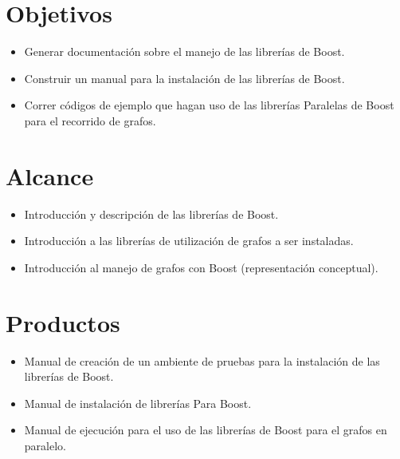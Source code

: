 \section{Objetivos}

	\begin{itemize}
		\item Generar documentación sobre el manejo de las librerías de Boost.
		\item Construir un manual para la instalación de las librerías de Boost.
		\item Correr códigos de ejemplo que hagan uso de las librerías Paralelas de Boost para el recorrido de grafos.	
	\end{itemize}

\section{Alcance}
	\begin{itemize}
		\item Introducción y descripción de las librerías de Boost.
		\item Introducción a las librerías de utilización de grafos a ser instaladas.
		\item Introducción al manejo de grafos con Boost (representación conceptual).
	\end{itemize}

\section{Productos}
	\begin{itemize}
		\item Manual de creación de un ambiente de pruebas para la instalación de las librerías de Boost.
		\item Manual de instalación de librerías Para Boost.
		\item Manual de ejecución para el uso de las librerías de Boost para el grafos en paralelo.	
	\end{itemize}

